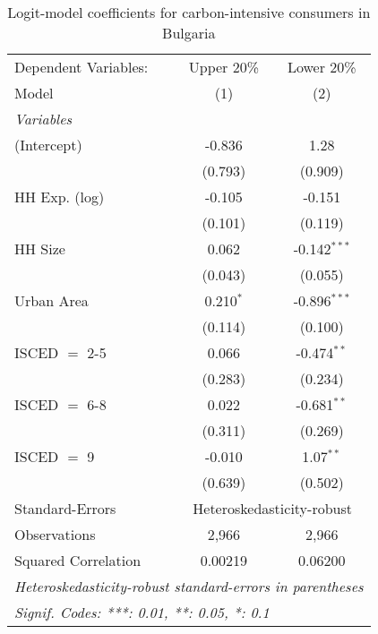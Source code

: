 
\begin{table}[htbp!]
   \centering
   \small
   \begin{adjustbox}{width = 1\textwidth, max height = 0.95\textheight, center}
      \begin{threeparttable}[b]
         \caption{\label{tab:Logit_1_BGR} Logit-model coefficients for carbon-intensive consumers in Bulgaria}
         \begin{tabular}{lcc}
            \tabularnewline \midrule \midrule
            Dependent Variables: & Upper 20\%  & Lower 20\%\\   
            Model                & (1)         & (2)\\  
            \midrule
            \emph{Variables}\\
            (Intercept)          & -0.836      & 1.28\\   
                                 & (0.793)     & (0.909)\\   
            HH Exp. (log)        & -0.105      & -0.151\\   
                                 & (0.101)     & (0.119)\\   
            HH Size              & 0.062       & -0.142$^{***}$\\   
                                 & (0.043)     & (0.055)\\   
            Urban Area           & 0.210$^{*}$ & -0.896$^{***}$\\   
                                 & (0.114)     & (0.100)\\   
            ISCED $=$ 2-5        & 0.066       & -0.474$^{**}$\\   
                                 & (0.283)     & (0.234)\\   
            ISCED $=$ 6-8        & 0.022       & -0.681$^{**}$\\   
                                 & (0.311)     & (0.269)\\   
            ISCED $=$ 9          & -0.010      & 1.07$^{**}$\\   
                                 & (0.639)     & (0.502)\\   
            \midrule 
            Standard-Errors & \multicolumn{2}{c}{Heteroskedasticity-robust} \\ 
            Observations         & 2,966       & 2,966\\  
            Squared Correlation  & 0.00219     & 0.06200\\  
            \midrule \midrule
            \multicolumn{3}{l}{\emph{Heteroskedasticity-robust standard-errors in parentheses}}\\
            \multicolumn{3}{l}{\emph{Signif. Codes: ***: 0.01, **: 0.05, *: 0.1}}\\
         \end{tabular}
         

\end{threeparttable}
\end{adjustbox}
\end{table}

